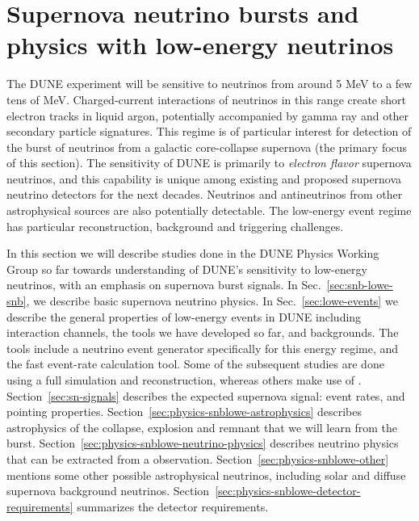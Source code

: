 \chapter{Supernova neutrino bursts and physics with low-energy neutrinos}
\label{ch:snb-lowe}


The DUNE experiment will be sensitive to neutrinos from around 5 MeV
to a few
tens of MeV.  Charged-current interactions of neutrinos in this range create short electron tracks in liquid argon, potentially accompanied by
gamma ray and other secondary particle signatures.   
This regime is of
particular interest for detection of the burst of neutrinos from a galactic
core-collapse supernova (the primary focus of this section). 
The sensitivity of DUNE is primarily to \textit{electron flavor} supernova neutrinos, and this capability is unique among existing and proposed supernova neutrino detectors for the next decades.  
Neutrinos and antineutrinos from other astrophysical sources are also potentially detectable.  
The low-energy event regime has particular reconstruction, background and triggering challenges.

In this section we will describe studies done in the DUNE %
Physics Working Group so far towards
understanding of DUNE's sensitivity to low-energy neutrinos, with an
emphasis on supernova burst signals.   In Sec.~\ref{sec:snb-lowe-snb},
we describe basic supernova neutrino physics.  In
Sec.~\ref{sec:lowe-events} we describe the general properties of
low-energy events in DUNE including interaction channels, the tools we
have developed so far, and backgrounds.  The tools include a neutrino event generator
specifically for this energy regime, and the  fast event-rate calculation tool.  Some of the subsequent studies are done using
a full simulation and reconstruction, whereas others make use of
 .
Section~\ref{sec:sn-signals} describes the
expected supernova signal: event rates, and pointing properties.
Section~\ref{sec:physics-snblowe-astrophysics} describes astrophysics
of the collapse, explosion and remnant that we will learn from the burst.
Section~\ref{sec:physics-snblowe-neutrino-physics} describes neutrino
physics that can be extracted from a  observation.
Section~\ref{sec:physics-snblowe-other} mentions
some other possible astrophysical neutrinos, including solar and
diffuse supernova background neutrinos.
Section~\ref{sec:physics-snblowe-detector-requirements} summarizes the
detector requirements.



